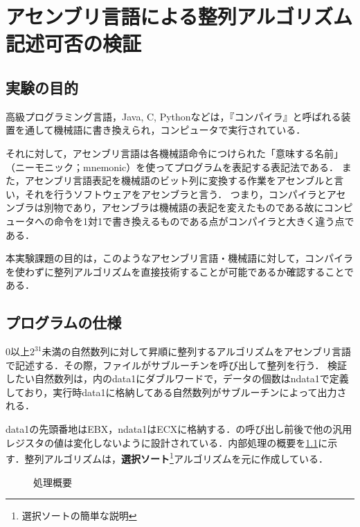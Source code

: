 \chapter{アセンブリ言語による整列アルゴリズム記述可否の検証}
\section{実験の目的}
高級プログラミング言語，{\ttfamily Java, C, Python}などは，『コンパイラ』と呼ばれる装置を通して機械語に書き換えられ，コンピュータで実行されている．\par
それに対して，アセンブリ言語は各機械語命令につけられた「意味する名前」（ニーモニック；mnemonic）を使ってプログラムを表記する表記法である．\cite{pl2text}
また，アセンブリ言語表記を機械語のビット列に変換する作業をアセンブルと言い，それを行うソフトウェアをアセンブラと言う．
つまり，コンパイラとアセンブラは別物であり，アセンブラは機械語の表記を変えたものである故にコンピュータへの命令を1対1で書き換えるものである点がコンパイラと大きく違う点である．\par
本実験課題の目的は，このようなアセンブリ言語・機械語に対して，コンパイラを使わずに整列アルゴリズムを直接技術することが可能であるか確認することである．
\section{プログラムの仕様}
\(0\)以上\(2^{31}\)未満の自然数列に対して昇順に整列するアルゴリズムをアセンブリ言語で記述する．その際，\testsort ファイルが\sort サブルーチンを呼び出して整列を行う．
検証したい自然数列は，\testsort 内の{\ttfamily data1}にダブルワードで，データの個数は{\ttfamily ndata1}で定義しており，\testsort 実行時{\ttfamily data1}に格納してある自然数列が\print サブルーチンによって出力される．\par
{\ttfamily data1}の先頭番地は{\ttfamily EBX}，{\ttfamily ndata1}は{\ttfamily ECX}に格納する．\sort の呼び出し前後で他の汎用レジスタの値は変化しないように設計されている．内部処理の概要を\ref{kadai1:abs}に示す．整列アルゴリズムは，\textbf{選択ソート}\footnote{選択ソートの簡単な説明}アルゴリズムを元に作成している．
\begin{figure}[H]
    \centering
    \caption{処理概要}
    \label{kadai1:abs}
\end{figure}
